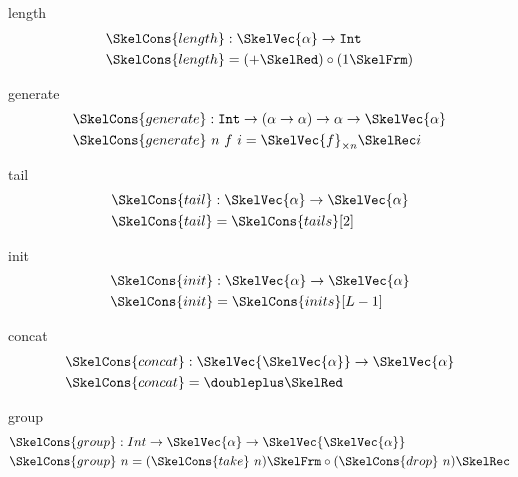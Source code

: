 \documentclass[preview]{standalone}
\begin{document}
\begin{docimage}{length}
\begin{align*}%
  \SkelCons{length} &: \SkelVec{\alpha} \rightarrow \mathtt{Int}\\
  \SkelCons{length} & = (+ \SkelRed) \circ (1 \SkelFrm)
\end{align*}
\end{docimage}

\begin{docimage}{generate}
\begin{align*}%
  \SkelCons{generate} &: \mathtt{Int} \rightarrow (\alpha \rightarrow \alpha) \rightarrow \alpha \rightarrow \SkelVec{\alpha}\\
  \SkelCons{generate} &\ n\ f\ i =  \SkelVec{f}_{\times n} \SkelRec i
\end{align*}
\end{docimage}

\begin{docimage}{tail}
\begin{align*}%
  \SkelCons{tail} &: \SkelVec{\alpha} \rightarrow \SkelVec{\alpha}\\
  \SkelCons{tail} & = \SkelCons{tails}[2]
\end{align*}
\end{docimage}


\begin{docimage}{init}
\begin{align*}%
  \SkelCons{init} &: \SkelVec{\alpha} \rightarrow \SkelVec{\alpha}\\
  \SkelCons{init} & = \SkelCons{inits}[L-1]
\end{align*}
\end{docimage}

\begin{docimage}{concat}
\begin{align*}%
  \SkelCons{concat} &: \SkelVec{\SkelVec{\alpha}} \rightarrow \SkelVec{\alpha}\\
  \SkelCons{concat} & = \doubleplus \SkelRed 
\end{align*}
\end{docimage}

\begin{docimage}{group}
  \begin{align*}
    \SkelCons{group} &: Int \rightarrow \SkelVec{\alpha} \rightarrow \SkelVec{\SkelVec{\alpha}} \\
    \SkelCons{group} &\ n = (\SkelCons{take}\ n) \SkelFrm \circ (\SkelCons{drop}\ n) \SkelRec
  \end{align*}
\end{docimage}
\end{document}
